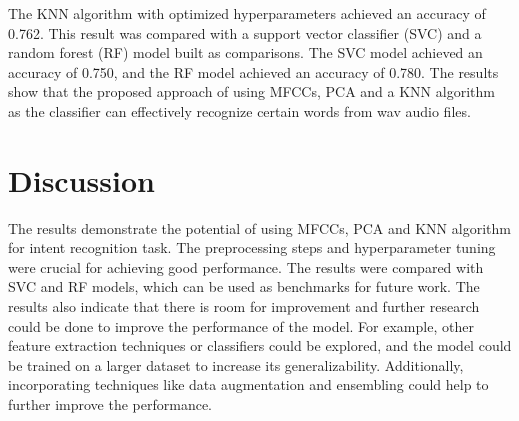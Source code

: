 \documentclass[conference]{IEEEtran}
\begin{document}
The KNN algorithm with optimized hyperparameters achieved an accuracy of 0.762.
This result was compared with a support vector classifier (SVC) and a random forest (RF) model built as comparisons.
The SVC model achieved an accuracy of 0.750, and the RF model achieved an accuracy of 0.780.
The results show that the proposed approach of using MFCCs, PCA and a KNN algorithm as the classifier can effectively recognize certain words from wav audio files.

\section{Discussion}
The results demonstrate the potential of using MFCCs, PCA and KNN algorithm for intent recognition task.
The preprocessing steps and hyperparameter tuning were crucial for achieving good performance.
The results were compared with SVC and RF models, which can be used as benchmarks for future work.
The results also indicate that there is room for improvement and further research could be done to improve the performance of the model.
For example, other feature extraction techniques or classifiers could be explored, and the model could be trained on a larger dataset to increase its generalizability.
Additionally, incorporating techniques like data augmentation and ensembling could help to further improve the performance.

\nocite{*}


\end{document}
